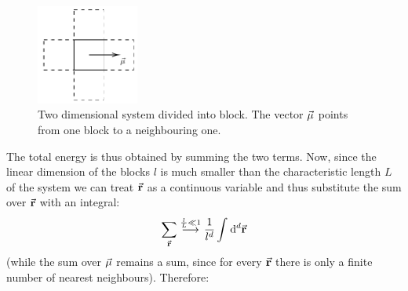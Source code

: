 \documentclass[../main/main.tex]{subfiles}
\begin{document}
\begin{itemize}
\begin{figure}[h!]
\centering
\includegraphics[width=0.3\textwidth]{../lessons/17_image/2.pdf}
\caption{\label{fig:17_2} Two dimensional system divided into block. The vector \( \va{\mu } \) points  from one block to a neighbouring one.}
\end{figure}

\end{itemize}

The total energy is thus obtained by summing the two terms. Now, since the linear dimension of the blocks \( l \)  is much smaller than the characteristic length \( L \) of the system we can treat \( \va{r} \)  as a continuous variable and thus substitute the sum over  \( \va{r} \) with an integral:
\begin{equation*}
  \sum_{\va{r}}^{}  \overset{\frac{l}{L} \ll 1}{\longrightarrow}   \frac{1}{l^d} \int_{}^{} \dd[d]{\va{r}}
\end{equation*}
(while the sum over \( \va{\mu } \) remains a sum, since for every \( \va{r} \)  there is only a finite number of nearest neighbours). Therefore:
\end{document}

